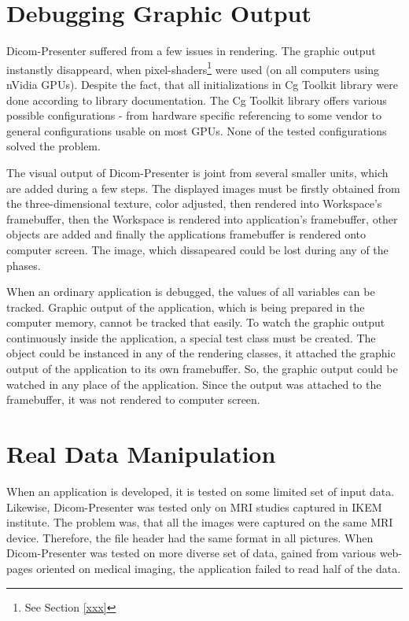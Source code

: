 \section{Debugging Graphic Output}
Dicom-Presenter suffered from a few issues in rendering. The graphic output instanstly disappeard, when pixel-shaders\footnote{See Section \ref{xxx}} were used (on all computers using nVidia GPUs). Despite the fact, that all initializations in Cg Toolkit library were done according to library documentation\cite{xxx}. The Cg Toolkit library offers various possible configurations - from hardware specific referencing to some vendor to general configurations usable on most GPUs. None of the tested configurations solved the problem.

The visual output of Dicom-Presenter is joint from several smaller units, which are added during a few steps. The displayed images must be firstly obtained from the three-dimensional texture, color adjusted, then rendered into Workspace's framebuffer, then the Workspace is rendered into application's framebuffer, other objects are added and finally the applications framebuffer is rendered onto computer screen. The image, which dissapeared could be lost during any of the phases.

When an ordinary application is debugged, the values of all variables can be tracked. Graphic output of the application, which is being prepared in the computer memory, cannot be tracked that easily. To watch the graphic output continuously inside the application, a special test class must be created. The object could be instanced in any of the rendering classes, it attached the graphic output of the application to its own framebuffer. So, the graphic output could be watched in any place of the application. Since the output was attached to the framebuffer, it was not rendered to computer screen.

\section{Real Data Manipulation}
When an application is developed, it is tested on some limited set of input data. Likewise, Dicom-Presenter was tested only on MRI studies captured in IKEM institute. The problem was, that all the images were captured on the same MRI device. Therefore, the file header had the same format in all pictures. When Dicom-Presenter was tested on more diverse set of data, gained from various web-pages oriented on medical imaging, the application failed to read half of the data.

